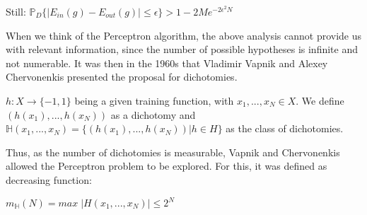 \documentclass{article}
\begin{document}
\hfill

Still: $\mathbb{P}_{D} \{ |E_{in} (g) - E_{out} (g)| \leq \epsilon \} > 1 - 2 M e^{-2 \epsilon^{2} N}$

\hfill

\hfill

\hfill

When we think of the Perceptron algorithm, the above analysis cannot provide us with relevant information, since the number of possible hypotheses is infinite and not numerable. It was then in the 1960s that Vladimir Vapnik and Alexey Chervonenkis presented the proposal for dichotomies.

\hfill

$h: X \rightarrow \{ -1, 1 \}$ being a given training function, with $x_{1}, ... , x_{N} \in X$. We define $(h(x_{1}), ... , h(x_{N}))$ as a dichotomy and $\mathbb{H} (x_{1}, ... , x_{N}) = \{ (h(x_{1}), ... , h(x_{N})) | h \in H \}$ as the class of dichotomies.

\hfill

Thus, as the number of dichotomies is measurable, Vapnik and Chervonenkis allowed the Perceptron problem to be explored. For this, it was defined as decreasing function:

\hfill

$m_{\mathbb{H}} (N) = max \; |H(x_{1}, ... , x_{N})| \leq 2^{N}$
\end{document}
